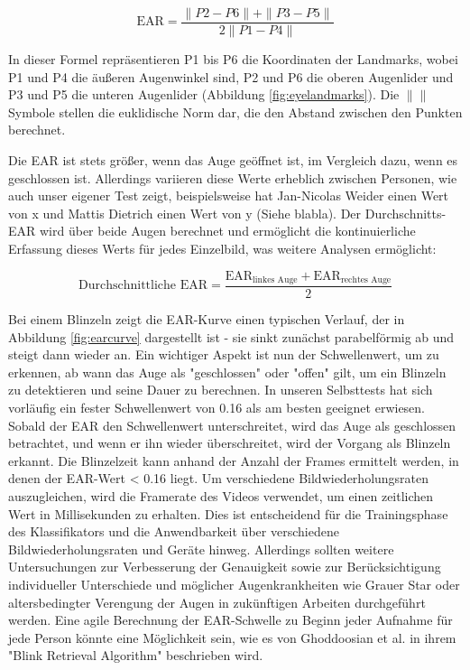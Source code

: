 \begin{equation}
	\text{EAR} = \frac{{\|P2 - P6\| + \|P3 - P5\|}}{{2\|P1 - P4\|}}
\end{equation}

In dieser Formel repräsentieren P1 bis P6 die Koordinaten der Landmarks, wobei P1 und P4 die äußeren Augenwinkel sind, P2 und P6 die oberen Augenlider und P3 und P5 die unteren Augenlider (Abbildung \ref{fig:eyelandmarks}). Die $ \| \| $ Symbole stellen die euklidische Norm dar, die den Abstand zwischen den Punkten berechnet.

Die EAR ist stets größer, wenn das Auge geöffnet ist, im Vergleich dazu, wenn es geschlossen ist. Allerdings variieren diese Werte erheblich zwischen Personen, wie auch unser eigener Test zeigt, beispielsweise hat Jan-Nicolas Weider einen Wert von x und Mattis Dietrich einen Wert von y (Siehe blabla). Der Durchschnitts-EAR wird über beide Augen berechnet und ermöglicht die kontinuierliche Erfassung dieses Werts für jedes Einzelbild, was weitere Analysen ermöglicht:

\begin{equation}
	\text{Durchschnittliche EAR} = \frac{{\text{EAR}_{\text{linkes Auge}} + \text{EAR}_{\text{rechtes Auge}}}}{2}
\end{equation}

Bei einem Blinzeln zeigt die EAR-Kurve einen typischen Verlauf, der in Abbildung \ref{fig:earcurve} dargestellt ist - sie sinkt zunächst parabelförmig ab und steigt dann wieder an. Ein wichtiger Aspekt ist nun der Schwellenwert, um zu erkennen, ab wann das Auge als "geschlossen" oder "offen" gilt, um ein Blinzeln zu detektieren und seine Dauer zu berechnen. In unseren Selbsttests hat sich vorläufig ein fester Schwellenwert von 0.16 als am besten geeignet erwiesen. Sobald der EAR den Schwellenwert unterschreitet, wird das Auge als geschlossen betrachtet, und wenn er ihn wieder überschreitet, wird der Vorgang als Blinzeln erkannt. Die Blinzelzeit kann anhand der Anzahl der Frames ermittelt werden, in denen der EAR-Wert < 0.16 liegt. Um verschiedene Bildwiederholungsraten auszugleichen, wird die Framerate des Videos verwendet, um einen zeitlichen Wert in Millisekunden zu erhalten. Dies ist entscheidend für die Trainingsphase des Klassifikators und die Anwendbarkeit über verschiedene Bildwiederholungsraten und Geräte hinweg.  Allerdings sollten weitere Untersuchungen zur Verbesserung der Genauigkeit sowie zur Berücksichtigung individueller Unterschiede und möglicher Augenkrankheiten wie Grauer Star oder altersbedingter Verengung der Augen in zukünftigen Arbeiten durchgeführt werden. Eine agile Berechnung der EAR-Schwelle zu Beginn jeder Aufnahme für jede Person könnte eine Möglichkeit sein, wie es von Ghoddoosian et al. \cite{GH19} in ihrem "Blink Retrieval Algorithm" beschrieben wird.

